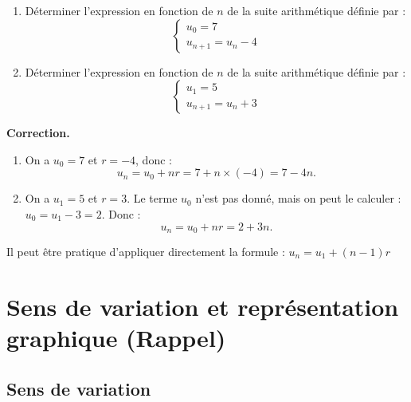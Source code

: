 \documentclass[10pt,a4paper]{article}
\newenvironment{correction}{\par\medskip\noindent\textbf{Correction.} }{\par\medskip}
\begin{document}
\begin{meth}

	\begin{enumerate}
		\item[a)] Déterminer l'expression en fonction de $n$ de la suite arithmétique définie par :
		      $$
			      \begin{cases}
				      u_0 = 7 \\
				      u_{n+1} = u_n - 4
			      \end{cases}
		      $$

		\item[b)] Déterminer l'expression en fonction de $n$ de la suite arithmétique définie par :
		      $$
			      \begin{cases}
				      u_1 = 5 \\
				      u_{n+1} = u_n + 3
			      \end{cases}
		      $$
	\end{enumerate}

	\begin{correction}
		\begin{enumerate}
			\item[a)] On a $u_0 = 7$ et $r = -4$, donc :
			      $$
				      u_n = u_0 + nr = 7 + n \times (-4) = 7 - 4n.
			      $$

			\item[b)] On a $u_1 = 5$ et $r = 3$. Le terme $u_0$ n'est pas donné, mais on peut le calculer :
			      $u_0 = u_1 - 3 = 2$. Donc :
			      $$
				      u_n = u_0 + nr = 2 + 3n.
			      $$
		\end{enumerate}
	\end{correction}

\end{meth}
\begin{rem}
	Il peut être pratique d'appliquer directement la formule : $\boxed{u_n = u_1 + (n-1)r}$
\end{rem}

\section{Sens de variation et représentation graphique (Rappel)}

\subsection{Sens de variation}
\end{document}
